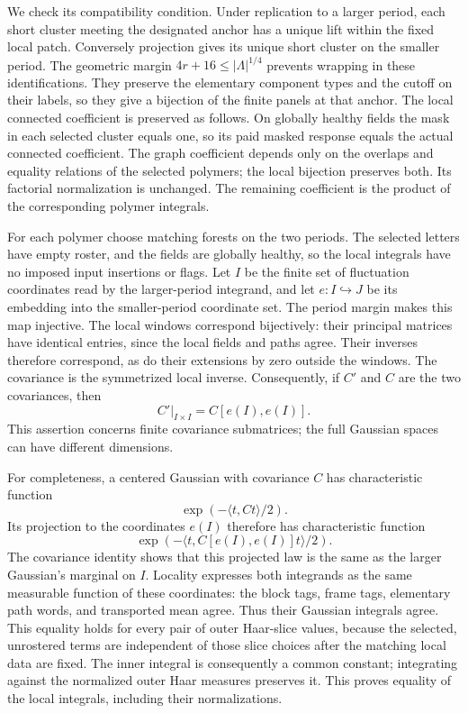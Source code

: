 We check its compatibility condition. Under replication to a larger
period, each short cluster meeting the designated anchor has a unique
lift within the fixed local patch. Conversely projection gives its
unique short cluster on the smaller period. The geometric margin
$4r+16\le |\Lambda|^{1/4}$ prevents wrapping in these identifications.
They preserve the elementary component types and the cutoff on their
labels, so they give a bijection of the finite panels at that anchor.
The local connected coefficient is preserved as follows. On globally
healthy fields the mask in each selected cluster equals one, so
its paid masked response equals the actual connected coefficient.
The graph coefficient depends only on the overlaps and equality
relations of the selected polymers; the local bijection preserves
both. Its factorial normalization is unchanged. The remaining
coefficient is the product of the corresponding polymer integrals.

For each polymer choose matching forests on the two periods. The
selected letters have empty roster, and the fields are globally
healthy, so the local integrals have no imposed input insertions or
flags. Let $I$ be the finite set of fluctuation coordinates read by
the larger-period integrand, and let $e:I\hookrightarrow J$ be its
embedding into the smaller-period coordinate set. The period margin
makes this map injective. The local windows correspond bijectively:
their principal matrices have identical entries, since the local
fields and paths agree. Their inverses therefore correspond, as do
their extensions by zero outside the windows. The covariance is the
symmetrized local inverse. Consequently, if $C'$ and $C$ are the two
covariances, then
\[
 C'|_{I\times I}=C[e(I),e(I)].
\]
This assertion concerns finite covariance submatrices; the full
Gaussian spaces can have different dimensions.

For completeness, a centered Gaussian with covariance $C$ has
characteristic function
\[
 \exp(-\langle t,Ct\rangle/2).
\]
Its projection to the coordinates $e(I)$ therefore has characteristic
function
\[
 \exp(-\langle t,C[e(I),e(I)]t\rangle/2).
\]
The covariance identity
shows that this projected law is the same as the larger Gaussian's
marginal on $I$. Locality expresses both integrands as the same
measurable function of these coordinates: the block tags, frame
tags, elementary path words, and transported mean agree. Thus their
Gaussian integrals agree. This equality holds for every pair of
outer Haar-slice values, because the selected, unrostered terms are
independent of those slice choices after the matching local data
are fixed. The inner integral is consequently a common constant;
integrating against the normalized outer Haar measures preserves
it. This proves equality of the local integrals, including their
normalizations.

